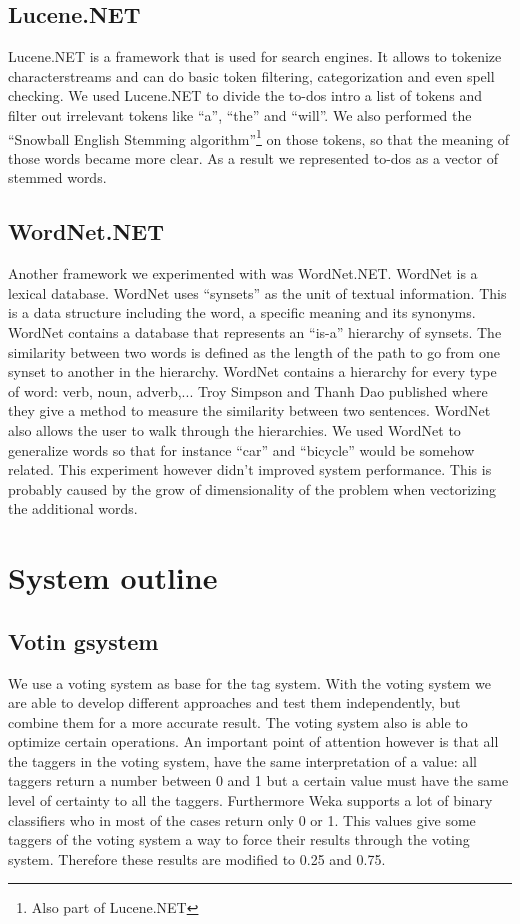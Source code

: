 \documentclass[a4paper,titlepage]{article}
\begin{document}
\subsection{Lucene.NET}
Lucene.NET is a framework that is used for search engines. It allows to tokenize characterstreams and can do basic token filtering, categorization and even spell checking. We used Lucene.NET to divide the to-dos intro a list of tokens and filter out irrelevant tokens like ``a'', ``the'' and ``will''. We also performed the ``Snowball English Stemming algorithm''\footnote{Also part of Lucene.NET} on those tokens, so that the meaning of those words became more clear. As a result we represented to-dos as a vector of stemmed words.
\subsection{WordNet.NET}
Another framework we experimented with was WordNet.NET. WordNet is a lexical database. WordNet uses ``synsets'' as the unit of textual information. This is a data structure including the word, a specific meaning and its synonyms. WordNet contains a database that represents an ``is-a'' hierarchy of synsets. The similarity between two words is defined as the length of the path to go from one synset to another in the hierarchy. WordNet contains a hierarchy for every type of word: verb, noun, adverb,... Troy Simpson and Thanh Dao published \cite{codeproject1} where they give a method to measure the similarity between two sentences. WordNet also allows the user to walk through the hierarchies. We used WordNet to generalize words so that for instance ``car'' and ``bicycle'' would be somehow related. This experiment however didn't improved system performance. This is probably caused by the grow of dimensionality of the problem when vectorizing the additional words.
\section{System outline}
\subsection{Votin gsystem}
We use a voting system as base for the tag system. With the voting system we are able to develop different approaches and test them independently, but combine them for a more accurate result. The voting system also is able to optimize certain operations. An important point of attention however is that all the taggers in the voting system, have the same interpretation of a value: all taggers return a number between 0 and 1
but a certain value must have the same level of certainty to all the taggers. Furthermore Weka supports a lot of binary classifiers who in most of the cases return only 0 or 1. This values give some taggers of the voting system a way to force their results through the voting system. Therefore these results are modified to 0.25 and 0.75.
\end{document}
